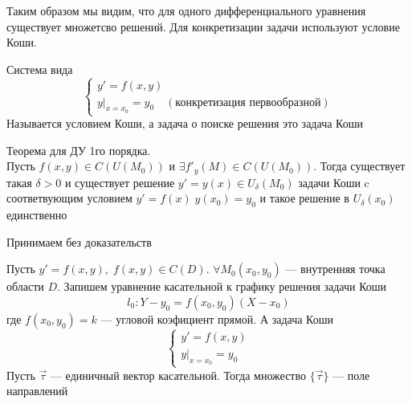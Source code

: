     Таким образом мы видим, что для одного дифференциального уравнения существует множетсво решений. Для конкретизации задачи используют условие Коши.

\begin{Def}
    Система вида
    \[
        \begin{cases}
            y' = f(x, y)\\
            y|_{x = x_0} = y_0 \quad (\text{конкретизация первообразной})
        \end{cases}
    \]
    Называется условием Коши, а задача о поиске решения это задача Коши
\end{Def}

    \begin{figure}[h!]
        \noindent{}
    \end{figure}

\begin{Th}
    Теорема для ДУ 1го порядка.\\
    Пусть $f(x, y) \in C(U(M_0))$ и $\exists f'_y(M) \in C(U(M_0))$. Тогда существует такая $\delta > 0$ и существует решение $y' = y(x) \in U_\delta(M_0)$ задачи Коши c соответвующим условием $y' = f(x) \; y(x_0) = y_0$ и такое решение в $U_\delta(x_0)$ единственно
\end{Th}
\begin{Proof}
    Принимаем без доказательств
\end{Proof}

\begin{Def}
    Пусть $y' = f(x, y), \; f(x, y) \in C(D)$. $\forall M_0(x_0, y_0)$ --- внутренняя точка области $D$. Запишем уравнение касательной к графику решения задачи Коши
    \[
        l_0 : Y-y_0 = f(x_0, y_0)(X-x_0)
    \]
    где $f(x_0, y_0) = k$ --- угловой коэфициент прямой. А задача Коши
    \[
        \begin{cases}
            y' = f(x, y)\\
            y|_{x = x_0} = y_0
        \end{cases}
    \]
    Пусть $\vec{\tau}$ --- единичный вектор касательной. Тогда множество $\{\vec{\tau}\}$ --- поле направлений
\end{Def}

